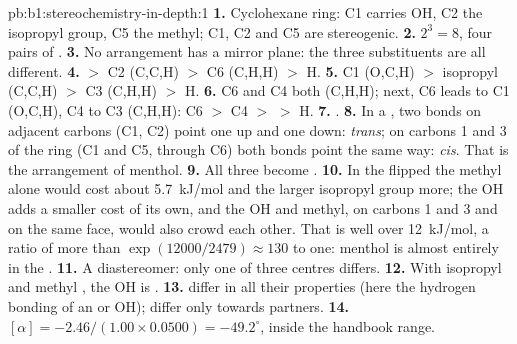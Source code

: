 \begin{solution}{pb:b1:stereochemistry-in-depth:1}
\textbf{1.} Cyclohexane ring: C1 carries OH, C2 the isopropyl group, C5 the
methyl; C1, C2 and C5 are stereogenic.
\textbf{2.} $2^3 = 8$, four pairs of .
\textbf{3.} No arrangement has a mirror plane: the three substituents are
all different.
\textbf{4.}  $>$ C2 (C,C,H) $>$ C6 (C,H,H) $>$ H.
\textbf{5.} C1 (O,C,H) $>$ isopropyl (C,C,H) $>$ C3 (C,H,H) $>$ H.
\textbf{6.} C6 and C4 both (C,H,H); next, C6 leads to C1 (O,C,H), C4 to C3
(C,H,H): C6 $>$ C4 $>$  $>$ H.
\textbf{7.} .
\textbf{8.} In a , two  bonds on adjacent carbons (C1, C2)
point one up and one down: \textit{trans}; on carbons 1 and 3 of the ring
(C1 and C5, through C6) both  bonds point the same way:
\textit{cis}. That is the arrangement of menthol.
\textbf{9.} All three become .
\textbf{10.} In the flipped  the methyl alone would cost about
\qty{5.7}{kJ/mol} and the larger isopropyl group more; the OH adds a smaller
cost of its own, and the  OH and methyl, on carbons 1 and 3 and on the
same face, would also crowd each other. That is well over \qty{12}{kJ/mol},
a ratio of more than $\exp(12000/2479) \approx 130$ to one: menthol is
almost entirely in the  .
\textbf{11.} A diastereomer: only one of three centres differs.
\textbf{12.} With isopropyl and methyl , the OH is .
\textbf{13.}  differ in all their properties (here the
hydrogen bonding of an  or  OH);  differ only
towards  partners.
\textbf{14.} $[\alpha] = -2.46/(1.00 \times 0.0500) = -49.2^\circ$, inside the
handbook range.

\end{solution}
